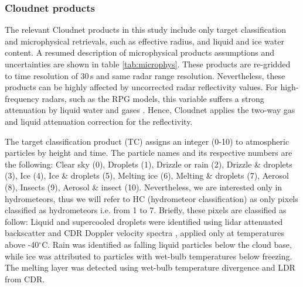 \subsubsection{Cloudnet products}\label{sec:cloudnet_products}

The relevant Cloudnet products in this study include only target classification  \citep{hoganFacilitatingCloudRadar2004} and microphysical retrievals, such as effective radius, and liquid and ice water content. A resumed description of microphysical products assumptions and uncertainties are shown in table \ref{tab:microphys}. These products are re-gridded to time resolution of 30\,s and same radar range resolution. Nevertheless, these products can be highly affected by uncorrected radar reflectivity values. For high-frequency radars, such as the RPG models, this variable suffers a strong attenuation by liquid water and gases \citep{hoganAbsoluteCalibration942003}. Hence, Cloudnet applies the two-way gas and liquid attenuation correction for the reflectivity. 

The target classification product (TC) assigns an integer (0-10) to atmospheric particles by height and time. The particle names and its respective numbers are the following: Clear sky (0), Droplets (1), Drizzle or rain (2), Drizzle \& droplets (3), Ice (4), Ice \& droplets (5), Melting ice (6), Melting \& droplets (7), Aerosol (8), Insects (9), Aerosol \& insect (10). Nevertheless, we are interested only in hydrometeors, thus we will refer to HC (hydrometeor classification) as only pixels classified as hydrometeors i.e. from 1 to 7. Briefly, these pixels are classified as follow: Liquid and supercooled droplets were identified using lidar attenuated backscatter and CDR Doppler velocity spectra \citep{schimmelIdentifyingCloudDroplets2022b}, applied only at temperatures above -40$^{\circ}$C. Rain was identified as falling liquid particles below the cloud base, while ice was attributed to particles with wet-bulb temperatures below freezing. The melting layer was detected using wet-bulb temperature divergence and LDR from CDR.

